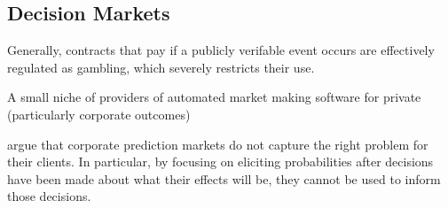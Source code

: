  \cite{mansour2015bayesian}





\subsection{Decision Markets}

Generally, contracts that pay if a publicly verifable event occurs are effectively regulated as gambling, which severely restricts their use. 

A small niche of providers of automated market making software for private (particularly corporate outcomes)



\cite{berg2003prediction,hanson2002decision,othman2010decision,boutilier2012eliciting,chen2014eliciting}



\cite{othman2010decision} argue that corporate prediction markets do not capture the right problem for their clients.
In particular, by focusing on eliciting probabilities after decisions have been made about what their effects will be, they cannot be used to inform those decisions. 

